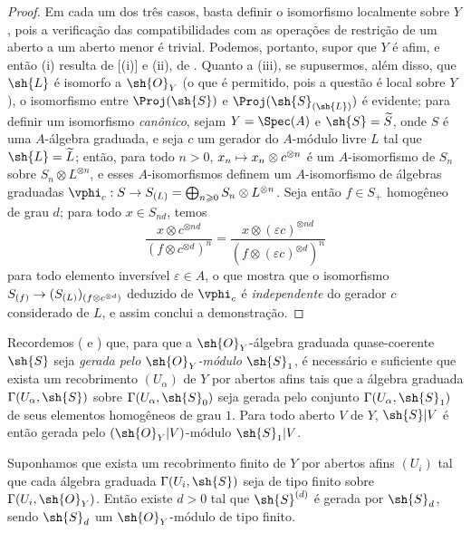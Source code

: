 \documentclass[oneside,10pt]{amsart}
\makeatletter
\renewcommand{\geq}{\geqslant}
\newcommand{\ega@arrow}[2]{\mathchoice{#1}{#2}{#2}{#2}}
\let\ega@shortmapsto\mapsto
\renewcommand{\to}{\ega@arrow{\longrightarrow}{\rightarrow}}
\renewcommand{\mapsto}{\ega@arrow{\longmapsto}{\ega@shortmapsto}}
\let\EGAOriginalLabel\label
\renewcommand{\label}[1]{\phantomsection\EGAOriginalLabel{#1}}
\makeatother
\begin{document}
\begin{proof}
Em cada um dos três casos, basta definir o isomorfismo localmente sobre $Y$, pois a verificação das compatibilidades com as operações de restrição de um aberto a um aberto menor é trivial.
Podemos, portanto, supor que $Y$ é afim, e então (i) resulta de [(i)] e (ii), de .
Quanto a (iii), se supusermos, além disso, que $\sh{L}$ é isomorfo a $\sh{O}_Y$ (o que é permitido, pois a questão é local sobre $Y$), o isomorfismo entre $\Proj(\sh{S})$ e $\Proj(\sh{S}_{(\sh{L})})$ é evidente;
para definir um isomorfismo \emph{canônico}, sejam $Y=\Spec(A)$ e $\sh{S}=\widetilde{S}$, onde $S$ é uma $A$-álgebra graduada, e seja $c$ um gerador do $A$-módulo livre $L$ tal que $\sh{L}=\widetilde{L}$;
então, para todo $n>0$, $x_n\mapsto x_n\otimes c^{\otimes n}$ é um $A$-isomorfismo de $S_n$ sobre $S_n\otimes L^{\otimes n}$, e esses $A$-isomorfismos definem um $A$-isomorfismo de álgebras graduadas $\vphi_c:S\to S_{(L)}=\bigoplus_{n\geq0}S_n\otimes L^{\otimes n}$.
Seja então $f\in S_+$ homogêneo de grau $d$;
para todo $x\in S_{nd}$, temos
\[
  \frac{x\otimes c^{\otimes nd}}{(f\otimes c^{\otimes d})^n}
  =
  \frac{x\otimes(\varepsilon c)^{\otimes nd}}{(f\otimes(\varepsilon c)^{\otimes d})^n}
\]
para todo elemento inversível $\varepsilon\in A$, o que mostra que o isomorfismo $S_{(f)}\to(S_{(L)})_{(f\otimes c^{\otimes d})}$ deduzido de $\vphi_c$ é \emph{independente} do gerador $c$ considerado de $L$, e assim conclui a demonstração.
\end{proof}

\begin{env}[3.1.9]
\label{II.3.1.9}
Recordemos ( e ) que, para que a $\sh{O}_Y$-álgebra graduada quase-coerente $\sh{S}$ seja \emph{gerada pelo $\sh{O}_Y$-módulo $\sh{S}_1$}, é necessário e suficiente que exista um recobrimento $(U_\alpha)$ de $Y$ por abertos afins tais que a álgebra graduada $\Gamma(U_\alpha,\sh{S})$ sobre $\Gamma(U_\alpha,\sh{S}_0)$ seja gerada pelo conjunto $\Gamma(U_\alpha,\sh{S}_1)$ de seus elementos homogêneos de grau $1$.
Para todo aberto $V$ de $Y$, $\sh{S}|V$ é então gerada pelo $(\sh{O}_Y|V)$-módulo $\sh{S}_1|V$.
\end{env}

\begin{proposition}[3.1.10]
\label{II.3.1.10}
Suponhamos que exista um recobrimento finito de $Y$ por abertos afins $(U_i)$ tal que cada álgebra graduada $\Gamma(U_i,\sh{S})$ seja de tipo finito sobre $\Gamma(U_i,\sh{O}_Y)$.
Então existe $d>0$ tal que $\sh{S}^{(d)}$ é gerada por $\sh{S}_d$, sendo $\sh{S}_d$ um $\sh{O}_Y$-módulo de tipo finito.
\end{proposition}
\end{document}
